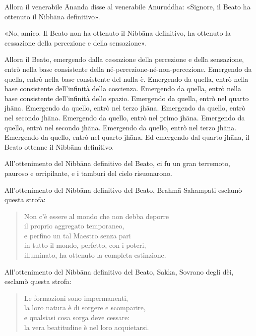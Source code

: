 Allora il venerabile Ānanda disse al venerabile Anuruddha: «Signore, il Beato ha
ottenuto il Nibbāna definitivo».

«No, amico. Il Beato non ha ottenuto il Nibbāna definitivo, ha ottenuto la
cessazione della percezione e della sensazione».

Allora il Beato, emergendo dalla cessazione della percezione e della sensazione,
entrò nella base consistente della né-percezione-né-non-percezione. Emergendo da
quella, entrò nella base consistente del nulla-è. Emergendo da quella, entrò
nella base consistente dell’infinità della coscienza. Emergendo da quella, entrò
nella base consistente dell’infinità dello spazio. Emergendo da quella, entrò
nel quarto jhāna. Emergendo da quello, entrò nel terzo jhāna. Emergendo da
quello, entrò nel secondo jhāna. Emergendo da quello, entrò nel primo jhāna.
Emergendo da quello, entrò nel secondo jhāna. Emergendo da quello, entrò nel
terzo jhāna. Emergendo da quello, entrò nel quarto jhāna. Ed emergendo dal
quarto jhāna, il Beato ottenne il Nibbāna definitivo.

All’ottenimento del Nibbāna definitivo del Beato, ci fu un gran terremoto,
pauroso e orripilante, e i tamburi del cielo risuonarono.

All’ottenimento del Nibbāna definitivo del Beato, Brahmā Sahampati esclamò
questa strofa:

\begin{quote}
Non c’è essere al mondo che non debba deporre \\
il proprio aggregato temporaneo, \\
e perfino un tal Maestro senza pari \\
in tutto il mondo, perfetto, con i poteri, \\
illuminato, ha ottenuto la completa estinzione.
\end{quote}


All’ottenimento del Nibbāna definitivo del Beato, Sakka, Sovrano degli dèi,
esclamò questa strofa:

\begin{quote}
Le formazioni sono impermanenti, \\
la loro natura è di sorgere e scomparire, \\
e qualsiasi cosa sorga deve cessare: \\
la vera beatitudine è nel loro acquietarsi.
\end{quote}


